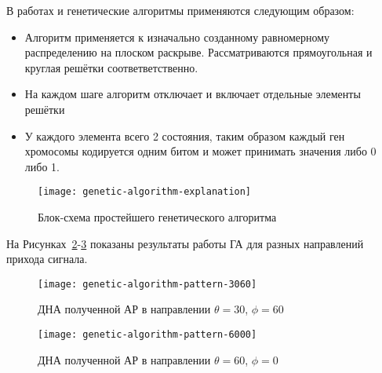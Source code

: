 В работах \cite{jain2012solving} и \cite{luo2015synthesis} генетические алгоритмы применяются следующим образом:

\begin{itemize}
    \item Алгоритм применяется к изначально созданному равномерному распределению на плоском раскрыве. Рассматриваются 
    прямоугольная и круглая решётки соответветственно. 
    \item На каждом шаге алгоритм отключает и включает отдельные элементы решётки
    \item У каждого элемента всего 2 состояния, таким образом каждый ген хромосомы кодируется одним битом и может
    принимать значения либо 0 либо 1.
\end{itemize}


\begin{figure}[H]
    \centering
    \texttt{[image: genetic-algorithm-explanation]}
    \caption{Блок-схема простейшего генетического алгоритма}%
    \label{fig:genetic-algorithm-explanation}
\end{figure}

На Рисунках~\ref{fig:genetic-algorithm-pattern-3060}-\ref{fig:genetic-algorithm-pattern-6000} показаны результаты работы ГА для разных направлений прихода сигнала.

\begin{figure}[H]
    \centering
    \texttt{[image: genetic-algorithm-pattern-3060]}
    \caption{ДНА полученной АР в направлении $\theta=30$, $\phi=60$}%
    \label{fig:genetic-algorithm-pattern-3060}
\end{figure}


\begin{figure}[H]
    \centering
    \texttt{[image: genetic-algorithm-pattern-6000]}
    \caption{ДНА полученной АР в направлении $\theta=60$, $\phi=0$}%
    \label{fig:genetic-algorithm-pattern-6000}
\end{figure}
